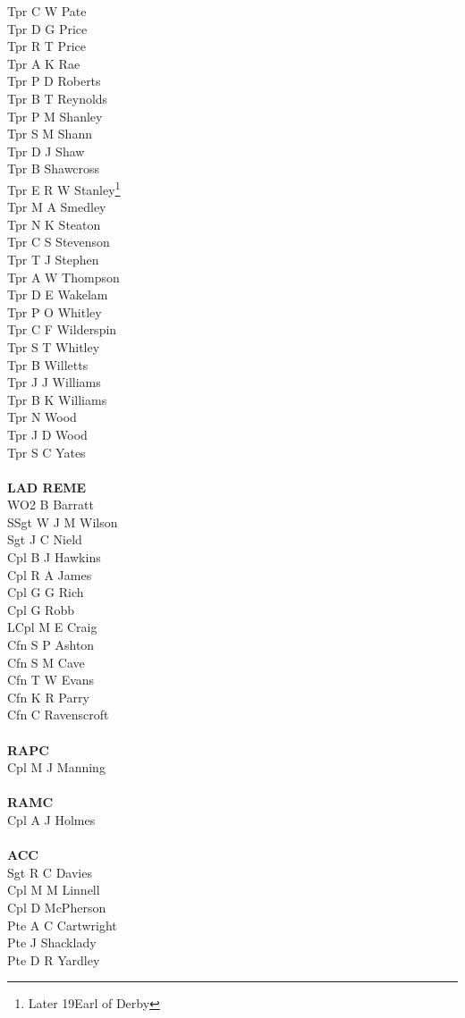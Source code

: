 \begin{multicols}{4}
  Tpr C W Pate \\
  Tpr D G Price \\
  Tpr R T Price \\
  Tpr A K Rae \\
  Tpr P D Roberts \\
  Tpr B T Reynolds \\
  Tpr P M Shanley \\
  Tpr S M Shann \\
  Tpr D J Shaw \\
  Tpr B Shawcross \\
  Tpr E R W Stanley\footnote{Later 19\nth Earl of Derby} \\
  Tpr M A Smedley \\
  Tpr N K Steaton \\
  Tpr C S Stevenson \\
  Tpr T J Stephen \\
  Tpr A W Thompson \\
  Tpr D E Wakelam \\
  Tpr P O Whitley \\
  Tpr C F Wilderspin \\
  Tpr S T Whitley \\
  Tpr B Willetts \\
  Tpr J J Williams \\
  Tpr B K Williams \\
  Tpr N Wood \\
  Tpr J D Wood \\
  Tpr S C Yates \\
  \\
  \textbf{LAD REME} \\
  WO2 B Barratt \\
  SSgt W J M Wilson \\
  Sgt J C Nield \\
  Cpl B J Hawkins \\
  Cpl R A James \\
  Cpl G G Rich \\
  Cpl G Robb \\
  LCpl M E Craig \\
  Cfn S P Ashton \\
  Cfn S M Cave \\
  Cfn T W Evans \\
  Cfn K R Parry \\
  Cfn C Ravenscroft \\
  \\
  \textbf{RAPC} \\
  Cpl M J Manning \\
  \\
  \textbf{RAMC} \\
  Cpl A J Holmes \\
  \\
  \textbf{ACC} \\
  Sgt R C Davies \\
  Cpl M M Linnell \\
  Cpl D McPherson \\
  Pte A C Cartwright \\
  Pte J Shacklady \\
  Pte D R Yardley
\end{multicols}

\pagebreak
